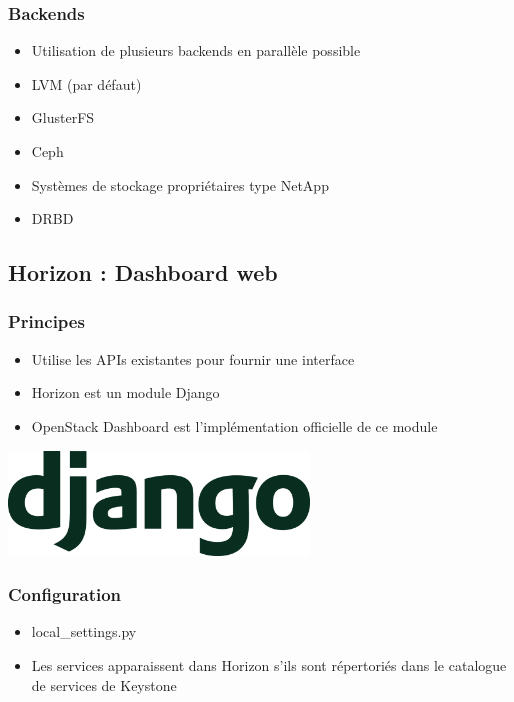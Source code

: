   \begin{frame}
    \frametitle{Backends}
    \begin{itemize}
      \item Utilisation de plusieurs backends en parallèle possible
      \item LVM (par défaut)
      \item GlusterFS
      \item Ceph
      \item Systèmes de stockage propriétaires type NetApp
      \item DRBD
    \end{itemize}
  \end{frame}

  \subsection[Horizon]{Horizon : Dashboard web}

  \begin{frame}
    \frametitle{Principes}
    \begin{itemize}
      \item Utilise les APIs existantes pour fournir une interface
      \item Horizon est un module Django
      \item OpenStack Dashboard est l'implémentation officielle de ce module
    \end{itemize}
    \begin{center}
      \includegraphics[width=8cm]{images/django-logo.png}
    \end{center}
  \end{frame}

  \begin{frame}
    \frametitle{Configuration}
    \begin{itemize}
      \item local\_settings.py
      \item Les services apparaissent dans Horizon s'ils sont répertoriés dans le catalogue de services de Keystone
    \end{itemize}
  \end{frame}

